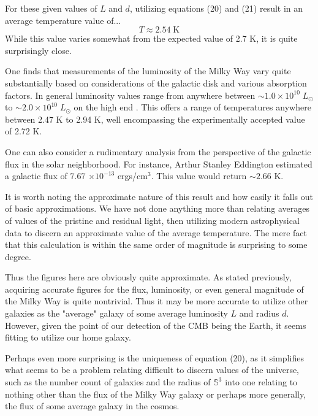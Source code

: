 \documentclass[a4paper]{article}
\begin{document}
    For these given values of $L$ and $d$, utilizing equations (20) and (21)
    result in an average temperature value of...
    \begin{equation*}
        T \approx 2.54 \; \text{K}
    \end{equation*}
    While this value varies somewhat from the expected value of 2.7 K, it is
    quite surprisingly close. 

    One finds that measurements of the luminosity of the Milky Way vary quite
    substantially based on considerations of the galactic disk and various
    absorption factors. In general luminosity values range from anywhere
    between $\sim 1.0 \times 10^{10} \; L_{\odot}$ to $\sim 2.0 \times 10^{10} \;
    L_{\odot}$ on the high end \cite{oregon}\cite{harvard}. This offers a range
    of temperatures anywhere between 2.47 K to 2.94 K, well encompassing the
    experimentally accepted value of 2.72 K.

    One can also consider a rudimentary analysis from the perspective of the
    galactic flux in the solar neighborhood. For instance, Arthur Stanley
    Eddington estimated a galactic flux of 7.67 $\times 10^{-13}$
    ergs/cm$^3$\cite{eddington}.  This value would return $\sim 2.66$ K.

    It is worth noting the approximate nature of this
    result and how easily it falls out of basic approximations. We have not
    done anything more than relating averages of values of the pristine and
    residual light, then utilizing modern astrophysical data to discern an
    approximate value of the average temperature. The mere fact that this
    calculation is within the same order of magnitude is surprising to some
    degree. 

    Thus the figures here are obviously quite approximate. As stated
    previously, acquiring accurate figures for the flux, luminosity, or even
    general magnitude of the Milky Way is quite nontrivial. Thus it may be more
    accurate to utilize other galaxies as the "average" galaxy of some average
    luminosity $L$ and radius $d$. However, given the point of our detection of
    the CMB being the Earth, it seems fitting to utilize our home galaxy.

    Perhaps even more surprising is the uniqueness of equation (20), as it
    simplifies what seems to be a problem relating difficult to discern
    values of the universe, such as the number count of galaxies and the radius
    of $\mathbb{S}^3$ into one relating to nothing other than the flux of the
    Milky Way galaxy or perhaps more generally, the flux of some average galaxy
    in the cosmos.
\end{document}
